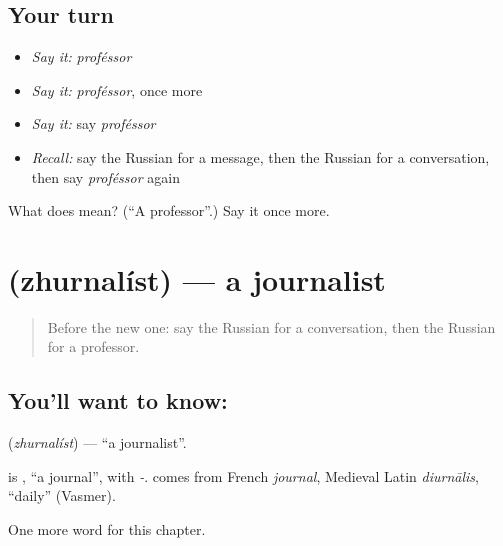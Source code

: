 \subsection*{Your turn}
\begin{itemize}
\raggedright
  \item \emph{Say it:} \emph{proféssor}
  \item \emph{Say it:} \emph{proféssor}, once more
  \item \emph{Say it:} say \emph{proféssor}
  \item \emph{Recall:} say the Russian for a message, then the Russian for a conversation, then say \emph{proféssor} again
\end{itemize}

\begin{tcolorbox}[breakable,colback=teal!4,colframe=teal!35!black,title={Before you move on}]
What does  mean? (\textquotedblleft{}A professor\textquotedblright{}.) Say it once more.
\end{tcolorbox}
\section[\texorpdfstring{\ru{журналист} (zhurnalíst)}{журналист (zhurnalíst)}]{ (zhurnalíst) — a journalist}

\label{lesson:RU-C256-zhurnalist}



\begin{quote}
Before the new one: say the Russian for a conversation, then the Russian for a professor.
\end{quote}

\subsection*{You'll want to know: }
\textbf{} (\emph{zhurnalíst}) — \textquotedblleft{}a journalist\textquotedblright{}.

\begin{cousinweb}
\textbf{} is \emph{}, \textquotedblleft{}a journal\textquotedblright{}, with \emph{-}. \emph{} comes from French \emph{journal}, Medieval Latin \emph{diurnālis}, \textquotedblleft{}daily\textquotedblright{} (Vasmer).
\end{cousinweb}

\begin{grammarlens}[title={What you've built}]
One more word for this chapter.
\end{grammarlens}

